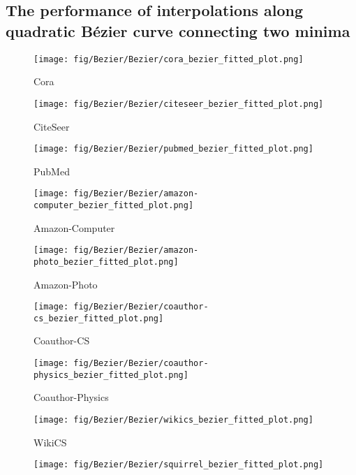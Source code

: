 \subsection{ The performance of interpolations along quadratic Bézier curve connecting two minima}
\begin{figure*}[!ht]
    \centering
    \begin{subfigure}[b]{0.24\textwidth}
        \texttt{[image: fig/Bezier/Bezier/cora\_bezier\_fitted\_plot.png]}
        \caption{Cora}
    \end{subfigure}
    \begin{subfigure}[b]{0.24\textwidth}
        \texttt{[image: fig/Bezier/Bezier/citeseer\_bezier\_fitted\_plot.png]}
        \caption{CiteSeer}
    \end{subfigure}
    \begin{subfigure}[b]{0.24\textwidth}
        \texttt{[image: fig/Bezier/Bezier/pubmed\_bezier\_fitted\_plot.png]}
        \caption{PubMed}
    \end{subfigure}
    \begin{subfigure}[b]{0.24\textwidth}
        \texttt{[image: fig/Bezier/Bezier/amazon-computer\_bezier\_fitted\_plot.png]}
        \caption{Amazon-Computer}
    \end{subfigure}
    \begin{subfigure}[b]{0.24\textwidth}
        \texttt{[image: fig/Bezier/Bezier/amazon-photo\_bezier\_fitted\_plot.png]}
        \caption{Amazon-Photo}
    \end{subfigure}
    \begin{subfigure}[b]{0.24\textwidth}
        \texttt{[image: fig/Bezier/Bezier/coauthor-cs\_bezier\_fitted\_plot.png]}
        \caption{Coauthor-CS}
    \end{subfigure}
    \begin{subfigure}[b]{0.24\textwidth}
        \texttt{[image: fig/Bezier/Bezier/coauthor-physics\_bezier\_fitted\_plot.png]}
        \caption{Coauthor-Physics}
    \end{subfigure}
    \begin{subfigure}[b]{0.24\textwidth}
        \texttt{[image: fig/Bezier/Bezier/wikics\_bezier\_fitted\_plot.png]}
        \caption{WikiCS}
    \end{subfigure}
    \begin{subfigure}[b]{0.24\textwidth}
        \texttt{[image: fig/Bezier/Bezier/squirrel\_bezier\_fitted\_plot.png]}

\end{subfigure}
\end{figure*}
